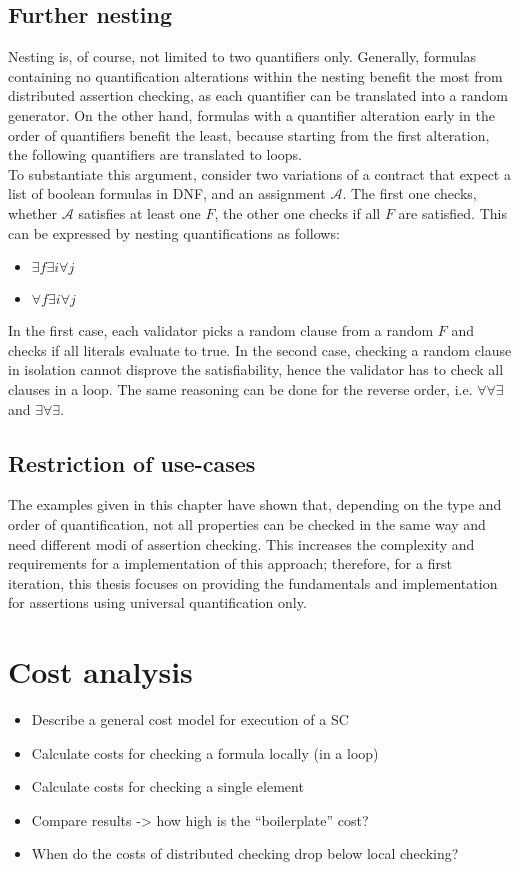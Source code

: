 \subsection{Further nesting}
Nesting is, of course, not limited to two quantifiers only. Generally, formulas containing no quantification alterations within the nesting benefit the most from distributed assertion checking, as each quantifier can be translated into a random generator. On the other hand, formulas with a quantifier alteration early in the order of quantifiers benefit the least, because starting from the first alteration, the following quantifiers are translated to loops.\\
To substantiate this argument, consider two variations of a contract that expect a list of boolean formulas in DNF, and an assignment $\mathcal{A}$. The first one checks, whether $\mathcal{A}$ satisfies at least one $F$, the other one checks if all $F$ are satisfied. This can be expressed by nesting quantifications as follows: 
\begin{itemize}
\item $\exists f \exists i \forall j$
\item $\forall f \exists i \forall j$
\end{itemize}
In the first case, each validator picks a random clause from a random $F$ and checks if all literals evaluate to true. In the second case, checking a random clause in isolation cannot disprove the satisfiability, hence the validator has to check all clauses in a loop. The same reasoning can be done for the reverse order, i.e. $\forall\forall\exists$ and $\exists\forall\exists$.

\subsection{Restriction of use-cases}
The examples given in this chapter have shown that, depending on the type and order of quantification, not all properties can be checked in the same way and need different modi of assertion checking. This increases the complexity and requirements for a implementation of this approach; therefore, for a first iteration, this thesis focuses on providing the fundamentals and implementation for assertions using universal quantification only.

\section{Cost analysis}
\begin{itemize}
\item Describe a general cost model for execution of a SC
\item Calculate costs for checking a formula locally (in a loop)
\item Calculate costs for checking a single element
\item Compare results -> how high is the ``boilerplate'' cost?
\item When do the costs of distributed checking drop below local checking?
\end{itemize}
